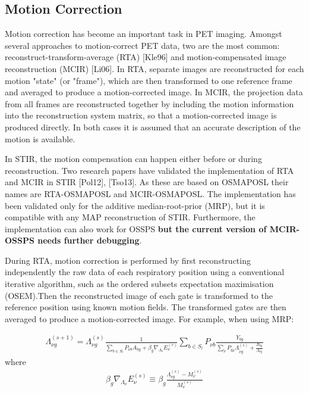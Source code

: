 \documentclass{article}
\begin{document}
{\subsection{
Motion Correction}
Motion correction has become an important task in PET imaging. Amongst several approaches to
motion-correct PET data, two are the most common: reconstruct-transform-average (RTA) [Kle96] and
motion-compensated image reconstruction (MCIR) [Li06]. In RTA, separate images are reconstructed for each
motion "state" (or "frame"), which are then transformed to one reference frame and averaged to produce a
motion-corrected image. In MCIR, the projection data from all frames are reconstructed together by
including the motion information into the reconstruction system matrix, so that a motion-corrected image
is produced directly. In both cases it is assumed that an accurate description of the motion is
available.

In STIR, the motion compensation can happen either before or during reconstruction. Two research papers
have validated the implementation of RTA and MCIR in STIR [Pol12], [Tso13]. As these are based on
OSMAPOSL their names are RTA-OSMAPOSL and MCIR-OSMAPOSL. The implementation has been validated only for
the additive median-root-prior (MRP), but it is compatible with any MAP reconstruction of STIR.
Furthermore, the implementation can also work for OSSPS \textbf{but the current version of MCIR-OSSPS
  needs further debugging}.

During RTA, motion correction is performed by first reconstructing independently the raw data of each
respiratory position using a conventional iterative algorithm, such as the ordered subsets expectation
maximisation (OSEM).Then the reconstructed image of each gate is transformed to the reference position
using known motion fields. The transformed gates are then averaged to produce a motion-corrected image.
For example, when using MRP:

\begin{equation}
\begin{array}{rrr}
\Lambda_{\nu g}^{(s+1)}=\Lambda_{\nu g}^{(s)}\frac{1}{ \sum\limits_{b\in S_{l}}P_{\nu b}A_{bg}+\beta_{g} \nabla_{\Lambda_{\nu}} E_{\nu}^{(s)}}\sum\limits_{b\in S_{l}}P_{\nu b}\frac{Y_{bg}}{\sum\limits_{\tilde{\nu}}P_{b\tilde{\nu}}\Lambda_{\tilde{\nu} g}^{(s)}+\frac{B_{bg}}{A_{bg}}}
\end{array}
\end{equation}
\noindent where
\begin{equation}
\begin{array}{rrr}
\beta_{g} \nabla_{\Lambda_{\nu}} E_{\nu}^{(s)} \equiv \beta_{g}\frac{\Lambda_{{\nu}g}^{(s)}-M_{{\nu}}^{(s)}}{M_{{\nu}}^{(s)}}
\end{array}
\end{equation}

}
\end{document}
